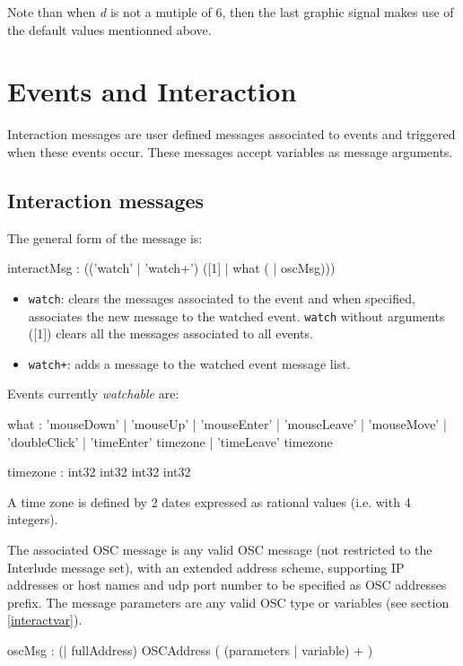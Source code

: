 \documentclass[a4paper,twoside]{report}
\newcommand{\toplevel}[1]	{\chapter{#1}}
\newcommand{\sublevel}[1]	{\section{#1}}
\newcommand{\OSC}[1]		{\texttt{#1}}
\begin{document}
Note than when \textit{d} is not a mutiple of 6, then the last graphic signal makes use of the default values mentionned above.

\toplevel{Events and Interaction}
\label{interaction}

Interaction messages are user defined messages associated to events and triggered when these events occur. These messages accept variables as message arguments.

\sublevel{Interaction messages}
\label{interactmsg}

The general form of the message is:

\begin{rail}
interactMsg : (('watch' | 'watch+')  ([1] | what  ( | oscMsg))) 
\end{rail}

\begin{itemize}
\item \OSC{watch}: clears the messages associated to the event and when specified, associates the new message to the watched event. \OSC{watch} without arguments ([1]) clears all the messages associated to all events.
\item \OSC{watch+}: adds a message to the watched event message list. 
\end{itemize}

Events currently \emph{watchable} are:
\begin{rail}
what : 'mouseDown' | 'mouseUp' | 'mouseEnter' | 'mouseLeave' | 'mouseMove' | 'doubleClick' | 'timeEnter' timezone | 'timeLeave' timezone
\end{rail}

\begin{rail}
timezone : int32 int32 int32 int32
\end{rail}
A time zone is defined by 2 dates expressed as rational values (i.e. with 4 integers).


The associated OSC message is any valid OSC message (not restricted to the Interlude message set), with an extended address scheme, supporting IP addresses or host names and udp port number to be specified as OSC addresses prefix. The message parameters are any valid OSC type or variables (see section \ref{interactvar}).
\begin{rail} 
oscMsg : (| fullAddress)  OSCAddress ( (parameters | variable) + )
\end{rail}
\end{document}
